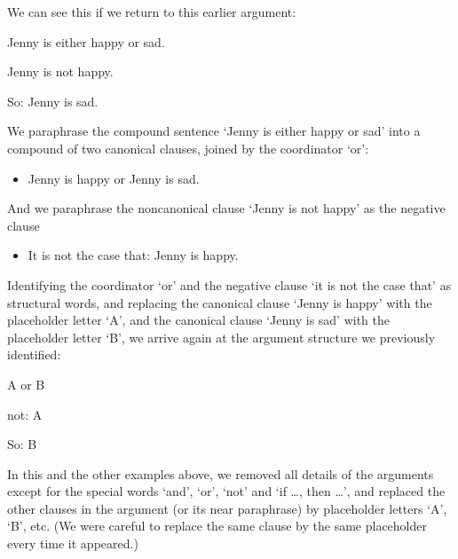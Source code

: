 We can see this if we return to this earlier argument: \begin{earg}
	\item[] Jenny is either happy or sad.
	\item[] Jenny is not happy.
	\item[So:] Jenny is sad.
\end{earg}
We paraphrase the compound sentence `Jenny is either happy or sad' into a compound of two canonical clauses, joined by the coordinator `or':
\begin{itemize}
\item Jenny is happy or Jenny is sad.
\end{itemize} 
And we paraphrase the noncanonical clause `Jenny is not happy' as the negative clause 
\begin{itemize}
	\item It is not the case that: Jenny is happy.

	\end{itemize} Identifying the coordinator `or' and the negative clause `it is not the case that' as structural words, and replacing the canonical clause `Jenny is happy' with the placeholder letter `A', and the canonical clause `Jenny is sad' with the placeholder letter `B', we arrive again at the argument structure we previously identified:
	\begin{earg}
		\item[] A \textsf{or} B
		\item[] \textsf{not}: A
		\item[So:] B
	\end{earg}

In this and the other examples above, we removed all details of the arguments except for the special words `and', `or', `not' and `if …, then …', and replaced the other clauses in the argument (or its near paraphrase) by placeholder letters `A', `B', etc. (We were careful to replace the same clause by the same placeholder every time it appeared.)

